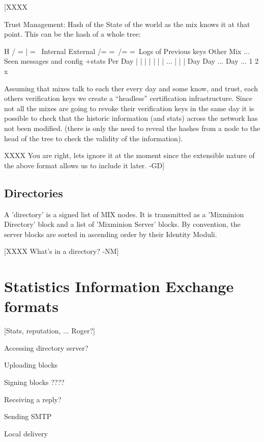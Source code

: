 [XXXX

Trust Management: Hash of the State of the world as the mix knows it at
        that point. This can be the hash of a whole tree:

		           H
             / =           |                   = \
	Internal                               External
 /=                  =\                     /=        =\
Logs of           Previous keys          Other Mix    ...
Seen messages     and config +stats       Per Day
|   |    |   |    |   |   |  ...          |   |   |
Day Day ...  Day  ...
1   2        x


Assuming that mixes talk to each ther every day and some know, and
trust, each others verification keys we create a ``headless''
certification infrastructure. Since not all the mixes are going to
revoke their verification keys in the same day it is possible to 
check that the historic information (and stats) across the network has
not been modified. (there is only the need to reveal the hashes from a
node to the head of the tree to check the validity of the information).

XXXX You are right, lets ignore it at the moment since the extensible 
nature of the above format allows us to include it later. -GD]

\subsection{Directories}

A 'directory' is a signed list of MIX nodes.  It is transmitted as a
'Mixminion Directory' block and a list of 'Mixminion Server' blocks.
By convention, the server blocks are sorted in ascending order by
their Identity Moduli.

[XXXX What's in a directory? -NM]

\section{Statistics Information Exchange formats}

[Stats, reputation, ... Roger?]

Accessing directory server?

Uploading blocks

Signing blocks ????

Receiving a reply?

Sending SMTP

Local delivery

